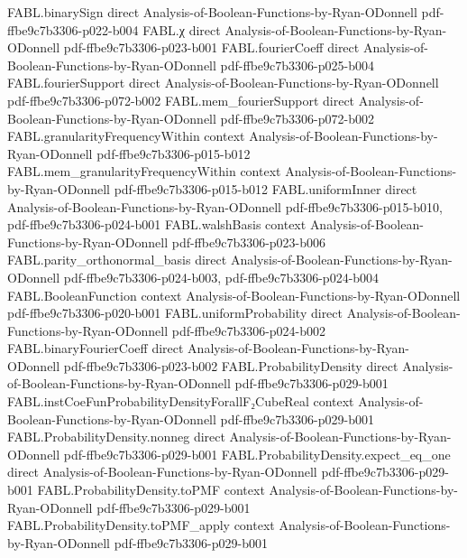 \begin{theorem}
  {FABL.binarySign}
  {direct}
  {Analysis-of-Boolean-Functions-by-Ryan-ODonnell}
  {pdf-ffbe9c7b3306-p022-b004}
\proofstep
  {FABL.χ}
  {direct}
  {Analysis-of-Boolean-Functions-by-Ryan-ODonnell}
  {pdf-ffbe9c7b3306-p023-b001}
\proofstep
  {FABL.fourierCoeff}
  {direct}
  {Analysis-of-Boolean-Functions-by-Ryan-ODonnell}
  {pdf-ffbe9c7b3306-p025-b004}
\proofstep
  {FABL.fourierSupport}
  {direct}
  {Analysis-of-Boolean-Functions-by-Ryan-ODonnell}
  {pdf-ffbe9c7b3306-p072-b002}
\proofstep
  {FABL.mem_fourierSupport}
  {direct}
  {Analysis-of-Boolean-Functions-by-Ryan-ODonnell}
  {pdf-ffbe9c7b3306-p072-b002}
\proofstep
  {FABL.granularityFrequencyWithin}
  {context}
  {Analysis-of-Boolean-Functions-by-Ryan-ODonnell}
  {pdf-ffbe9c7b3306-p015-b012}
\proofstep
  {FABL.mem_granularityFrequencyWithin}
  {context}
  {Analysis-of-Boolean-Functions-by-Ryan-ODonnell}
  {pdf-ffbe9c7b3306-p015-b012}
\proofstep
  {FABL.uniformInner}
  {direct}
  {Analysis-of-Boolean-Functions-by-Ryan-ODonnell}
  {pdf-ffbe9c7b3306-p015-b010,
    pdf-ffbe9c7b3306-p024-b001}
\proofstep
  {FABL.walshBasis}
  {context}
  {Analysis-of-Boolean-Functions-by-Ryan-ODonnell}
  {pdf-ffbe9c7b3306-p023-b006}
\proofstep
  {FABL.parity_orthonormal_basis}
  {direct}
  {Analysis-of-Boolean-Functions-by-Ryan-ODonnell}
  {pdf-ffbe9c7b3306-p024-b003,
    pdf-ffbe9c7b3306-p024-b004}
\proofstep
  {FABL.BooleanFunction}
  {context}
  {Analysis-of-Boolean-Functions-by-Ryan-ODonnell}
  {pdf-ffbe9c7b3306-p020-b001}
\proofstep
  {FABL.uniformProbability}
  {direct}
  {Analysis-of-Boolean-Functions-by-Ryan-ODonnell}
  {pdf-ffbe9c7b3306-p024-b002}
\proofstep
  {FABL.binaryFourierCoeff}
  {direct}
  {Analysis-of-Boolean-Functions-by-Ryan-ODonnell}
  {pdf-ffbe9c7b3306-p023-b002}
\proofstep
  {FABL.ProbabilityDensity}
  {direct}
  {Analysis-of-Boolean-Functions-by-Ryan-ODonnell}
  {pdf-ffbe9c7b3306-p029-b001}
\proofstep
  {FABL.instCoeFunProbabilityDensityForallF₂CubeReal}
  {context}
  {Analysis-of-Boolean-Functions-by-Ryan-ODonnell}
  {pdf-ffbe9c7b3306-p029-b001}
\proofstep
  {FABL.ProbabilityDensity.nonneg}
  {direct}
  {Analysis-of-Boolean-Functions-by-Ryan-ODonnell}
  {pdf-ffbe9c7b3306-p029-b001}
\proofstep
  {FABL.ProbabilityDensity.expect_eq_one}
  {direct}
  {Analysis-of-Boolean-Functions-by-Ryan-ODonnell}
  {pdf-ffbe9c7b3306-p029-b001}
\proofstep
  {FABL.ProbabilityDensity.toPMF}
  {context}
  {Analysis-of-Boolean-Functions-by-Ryan-ODonnell}
  {pdf-ffbe9c7b3306-p029-b001}
\proofstep
  {FABL.ProbabilityDensity.toPMF_apply}
  {context}
  {Analysis-of-Boolean-Functions-by-Ryan-ODonnell}
  {pdf-ffbe9c7b3306-p029-b001}

\end{theorem}
